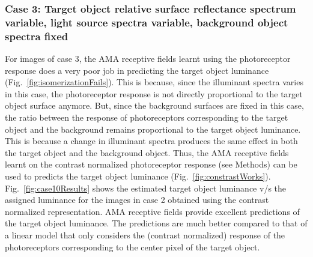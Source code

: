 \documentclass{jov}
\begin{document}
\subsubsection{Case 3: Target object relative surface reflectance spectrum variable, light source spectra variable, background object spectra fixed}
For images of case 3, the AMA receptive fields learnt using the photoreceptor response does a very poor job in predicting the target object luminance (Fig.~\ref{fig:isomerizationFails}). 
This is because, since the illuminant spectra varies in this case, the photoreceptor response is not directly proportional to the target object surface anymore. 
But, since the background surfaces are fixed in this case, the ratio between the response of  photoreceptors corresponding to the target object and the background remains proportional to the target object luminance. 
This is because a change in illuminant spectra produces the same effect in both the target object and the background object. 
Thus, the AMA receptive fields learnt on the contrast normalized photoreceptor response (see Methods) can be used to predicts the target object luminance (Fig.~\ref{fig:constrastWorks}). 
Fig.~\ref{fig:case10Results} shows the estimated target object luminance v/s the assigned luminance for the images in case 2 obtained using the contrast normalized representation. 
AMA receptive fields provide excellent predictions of the target object luminance. 
The predictions are much better compared to that of a linear model that only considers the (contrast normalized) response of the photoreceptors corresponding to the center pixel of the target object.
\end{document}
